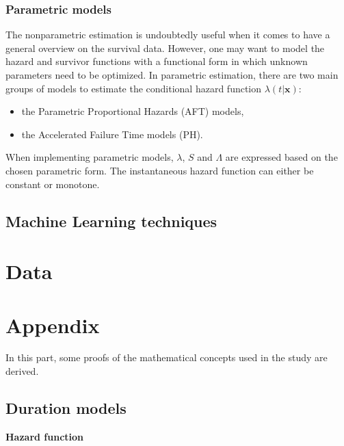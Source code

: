 \documentclass[
]{book}
\providecommand{\tightlist}{%
  \setlength{\itemsep}{0pt}\setlength{\parskip}{0pt}}
\begin{document}
\hypertarget{parametric-models}{%
\subsection{Parametric models}\label{parametric-models}}

The nonparametric estimation is undoubtedly useful when it comes to have a general overview on the survival data. However, one may want to model the hazard and survivor functions with a functional form in which unknown parameters need to be optimized. In parametric estimation, there are two main groups of models to estimate the conditional hazard function \(\lambda(t | \pmb{x})\):

\begin{itemize}
\tightlist
\item
  the Parametric Proportional Hazards (AFT) models,
\item
  the Accelerated Failure Time models (PH).
\end{itemize}

When implementing parametric models, \(\lambda\), \(S\) and \(\Lambda\) are expressed based on the chosen parametric form. The instantaneous hazard function can either be constant or monotone.

\hypertarget{ML}{%
\section{Machine Learning techniques}\label{ML}}

\hypertarget{data}{%
\chapter{Data}\label{data}}

\hypertarget{appendix}{%
\chapter*{Appendix}\label{appendix}}

In this part, some proofs of the mathematical concepts used in the study are derived.

\hypertarget{duration-models-1}{%
\section*{Duration models}\label{duration-models-1}}

\textbf{Hazard function}
\end{document}
